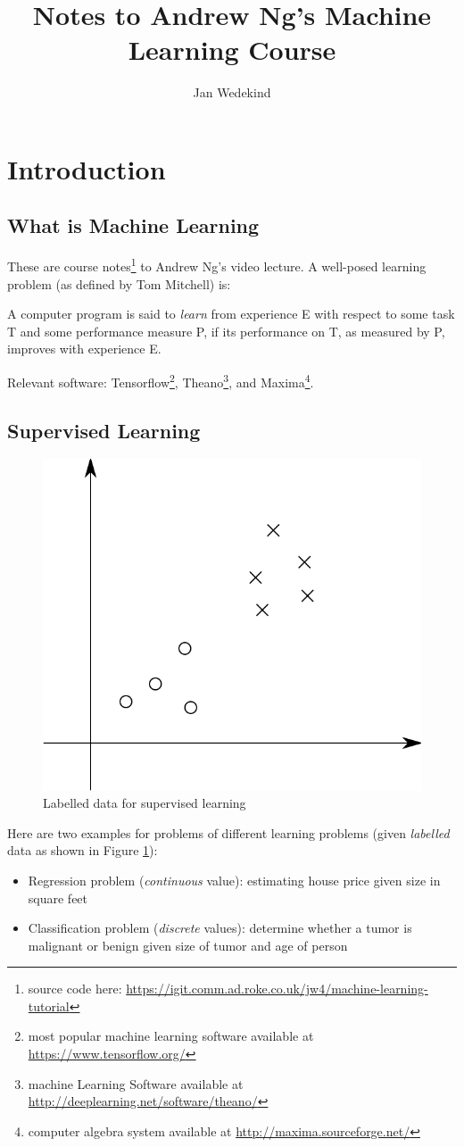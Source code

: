 \documentclass[a4paper,twoside,10pt]{article}
\title{Notes to Andrew Ng's Machine Learning Course}
\author{Jan Wedekind}
\begin{document}
\maketitle

\section{Introduction}

\subsection{What is Machine Learning}
These are course notes\footnote{source code here: \url{https://igit.comm.ad.roke.co.uk/jw4/machine-learning-tutorial}} to Andrew Ng's video lecture\citep{andrewng}.
A well-posed learning problem (as defined by Tom Mitchell) is:
\begin{displayquote}
  A computer program is said to \emph{learn} from experience E with respect to some task T and some performance measure P, if its performance on T, as measured by P, improves with experience E.
\end{displayquote}

Relevant software: Tensorflow\footnote{most popular machine learning software available at \url{https://www.tensorflow.org/}},
Theano\footnote{machine Learning Software available at \url{http://deeplearning.net/software/theano/}},
and Maxima\footnote{computer algebra system available at \url{http://maxima.sourceforge.net/}}.

\subsection{Supervised Learning}
\begin{figure}[htbp]
  \begin{center}
    \includegraphics[width=.4\textwidth]{supervised}
    \caption{Labelled data for supervised learning\label{fig:supervised}}
  \end{center}
\end{figure}
Here are two examples for problems of different learning problems (given \emph{labelled} data as shown in Figure \ref{fig:supervised}):
\begin{itemize}
  \item Regression problem (\emph{continuous} value): estimating house price given size in square feet
  \item Classification problem (\emph{discrete} values): determine whether a tumor is malignant or benign given size of tumor and age of person
\end{itemize}
\end{document}
